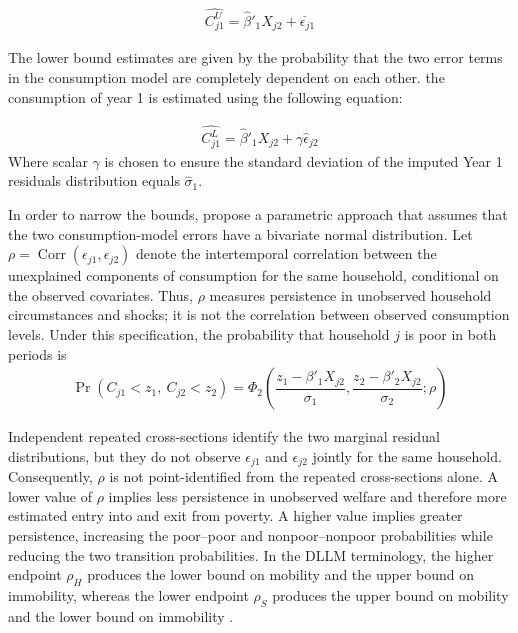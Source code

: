 \documentclass[12pt,a4paper]{article}
\begin{document}
	 \begin{align*}
	 	\widehat{C_{j1}^U} = \hat{\beta}'_1X_{j2} + \check{\epsilon_{j1}}
	 \end{align*}
 
 The lower bound estimates are given by the probability that 
 the two error terms in the consumption model are completely dependent on each other. the consumption of year 1 is estimated using the following equation:
 
 \begin{align*}
 	\widehat{C_{j1}^L} = \hat{\beta}'_1X_{j2} + \gamma \hat{\epsilon}_{j2}
 \end{align*}
 Where scalar $\gamma$ is chosen to ensure the standard deviation of the imputed Year 1 residuals distribution equals $\hat{\sigma}_1$. 

In order to narrow the bounds, \citet{dang2014using} propose a parametric approach that assumes that the two consumption-model errors have a bivariate normal distribution. Let $\rho=\operatorname{Corr}(\epsilon_{j1},\epsilon_{j2})$ denote the intertemporal correlation between the unexplained components of consumption for the same household, conditional on the observed covariates. Thus, $\rho$ measures persistence in unobserved household circumstances and shocks; it is not the correlation between observed consumption levels. Under this specification, the probability that household $j$ is poor in both periods is
\begin{align}
	\Pr(C_{j1}<z_1,\ C_{j2}<z_2) = \Phi_2 \left(\dfrac{z_1-\beta'_1X_{j2}}{\sigma_1}, \dfrac{z_2-\beta'_2X_{j2}}{\sigma_2};\rho \right)
	\label{eq:joint-poor}
\end{align}

Independent repeated cross-sections identify the two marginal residual distributions, but they do not observe $\epsilon_{j1}$ and $\epsilon_{j2}$ jointly for the same household. Consequently, $\rho$ is not point-identified from the repeated cross-sections alone. A lower value of $\rho$ implies less persistence in unobserved welfare and therefore more estimated entry into and exit from poverty. A higher value implies greater persistence, increasing the poor--poor and nonpoor--nonpoor probabilities while reducing the two transition probabilities. In the DLLM terminology, the higher endpoint $\rho_H$ produces the lower bound on mobility and the upper bound on immobility, whereas the lower endpoint $\rho_S$ produces the upper bound on mobility and the lower bound on immobility \citep[pp.~113--120]{dang2014using}.
\end{document}
